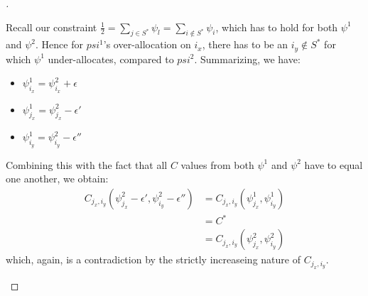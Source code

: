 \begin{proof}[]
\begin{enumerate}[(i)]
\begin{itemize}
      Recall our constraint $\frac{1}{2} = \sum_{j \in S^*} \psi_l = \sum_{i \notin S^*} \psi_i$, which has to hold for both $\psi^1$ and $\psi^2$.
      Hence for $psi^1$'s over-allocation on $i_x$, there has to be an $i_y \notin S^*$ for which $\psi^1$ under-allocates, compared to $psi^2$.
      Summarizing, we have:
      \begin{itemize}
        \item $\psi^1_{i_x} = \psi^2_{i_x} + \epsilon$
        \item $\psi^1_{j_x} = \psi^2_{j_x} - \epsilon'$
        \item $\psi^1_{i_y} = \psi^2_{i_y} - \epsilon''$
      \end{itemize}
      Combining this with the fact that all $C$ values from both $\psi^1$ and $\psi^2$ have to equal one another, we obtain:
      \begin{align}
        C_{j_x, i_y}(\psi^2_{j_x} - \epsilon', \psi^2_{i_y} - \epsilon'') &= C_{j_x, i_y}(\psi^1_{j_x}, \psi^1_{i_y}) \\
        &= C^* \\
        &= C_{j_x, i_y}(\psi^2_{j_x}, \psi^2_{i_y})
      \end{align}
      which, again, is a contradiction by the strictly increaseing nature of $C_{j_x, i_y}$.
    \end{itemize}
  \end{enumerate}
\end{proof}

